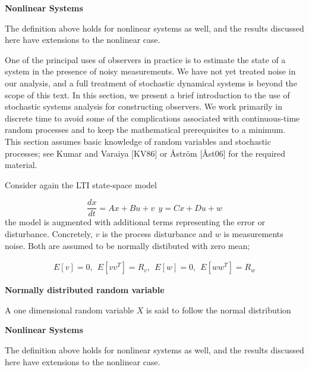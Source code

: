 \begin{framed}
\theoremstyle{remark}
\begin{remark}{\textbf{Nonlinear Systems}}

The definition above holds for nonlinear systems as well, and the results discussed here have extensions to the nonlinear case.
\end{remark}
\end{framed}


One of the principal uses of observers in practice is to estimate the state of a
system in the presence of noisy measurements. We have not yet treated noise in our
analysis, and a full treatment of stochastic dynamical systems is beyond the scope
of this text. In this section, we present a brief introduction to the use of stochastic
systems analysis for constructing observers. We work primarily in discrete time to
avoid some of the complications associated with continuous-time random processes
and to keep the mathematical prerequisites to a minimum. This section assumes
basic knowledge of random variables and stochastic processes; see Kumar and
Varaiya [KV86] or Åström [Åst06] for the required material.




Consider again the LTI state-space model

\begin{equation}
\frac{dx}{dt} = Ax + Bu +v  ~~ y = Cx + Du +w 
\end{equation}
the model is augmented with additional terms representing the error or disturbance. Concretely,
$v$ is the process disturbance and $w$ is measurements noise. Both are assumed to be normally distibuted with zero mean;

\begin{eqnarray}
E[v] = 0, ~~ E[vv^T] = R_v, ~~ E[w] = 0, ~~ E[ww^T] = R_w 
\label{noise_proccess_1} 
\end{eqnarray}



\begin{framed}
\theoremstyle{remark}
\begin{remark}{\textbf{Normally distributed random variable}}

A one dimensional random variable $X$ is said to follow the normal distribution
\end{remark}
\end{framed}


\begin{framed}
\theoremstyle{remark}
\begin{remark}{\textbf{Nonlinear Systems}}

The definition above holds for nonlinear systems as well, and the results discussed here have extensions to the nonlinear case.
\end{remark}
\end{framed}

